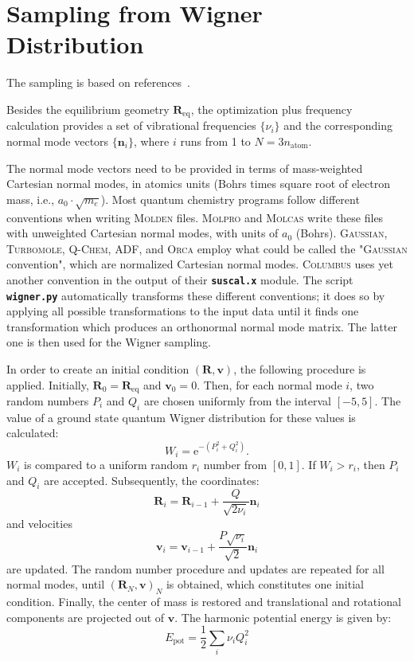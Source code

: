 \documentclass[a4paper,10pt,DIV=15,openany]{scrbook}
\newcommand{\ttt}[1]{\textbf{\texttt{#1}}}
\newcommand{\E}{\ensuremath{\mathrm{e}}}
\newcommand{\VEC}[1]{\ensuremath{\mathbf{#1}}}
\begin{document}
\section{Sampling from Wigner Distribution}\label{met:wigner}

The sampling is based on references~\cite{Dahl1988JCP, Schinke1995}.

Besides the equilibrium geometry $\VEC{R}_{\text{eq}}$, the optimization plus frequency calculation provides a set of vibrational frequencies $\{\nu_i\}$ and the corresponding normal mode vectors $\{\VEC{n}_i\}$, where $i$ runs from 1 to $N=3n_{\text{atom}}$.

The normal mode vectors need to be provided in terms of mass-weighted Cartesian normal modes, in atomics units (Bohrs times square root of electron mass, i.e., $a_0\cdot\sqrt{m_e}$).
Most quantum chemistry programs follow different conventions when writing \textsc{Molden} files. \textsc{Molpro} and \textsc{Molcas} write these files with unweighted Cartesian normal modes, with units of $a_0$ (Bohrs). \textsc{Gaussian}, \textsc{Turbomole}, \textsc{Q-Chem}, \textsc{ADF}, and \textsc{Orca} employ what could be called the "\textsc{Gaussian} convention", which are normalized Cartesian normal modes. \textsc{Columbus} uses yet another convention in the output of their \ttt{suscal.x} module.
The script \ttt{wigner.py} automatically transforms these different conventions; it does so by applying all possible transformations to the input data until it finds one transformation which produces an orthonormal normal mode matrix.
The latter one is then used for the Wigner sampling.

In order to create an initial condition $(\VEC{R},\VEC{v})$, the following procedure is applied. Initially, $\VEC{R}_0=\VEC{R}_{\text{eq}}$ and $\VEC{v}_0=0$. Then, for each normal mode $i$, two random numbers $P_i$ and $Q_i$ are chosen uniformly from the interval $[-5,5]$. The value of a ground state quantum Wigner distribution for these values is calculated:
\begin{equation}
  W_i=\E^{-(P_i^2+Q_i^2)}.
\end{equation}
$W_i$ is compared to a uniform random $r_i$ number from $[0,1]$. If $W_i>r_i$, then $P_i$ and $Q_i$ are accepted.
Subsequently, the coordinates:
\begin{equation}
  \VEC{R}_i=\VEC{R}_{i-1} + \frac{Q}{\sqrt{2\nu_i}}\VEC{n}_i           \label{eq:wigner1}
\end{equation}
and velocities
\begin{equation}
  \VEC{v}_i=\VEC{v}_{i-1} + \frac{P\sqrt{\nu_i}}{\sqrt{2}}\VEC{n}_i    \label{eq:wigner2}
\end{equation}
are updated.
The random number procedure and updates are repeated for all normal modes, until $(\VEC{R}_N,\VEC{v})_N$ is obtained, which constitutes one initial condition. Finally, the center of mass is restored and translational and rotational components are projected out of $\VEC{v}$. The harmonic potential energy is given by:
\begin{equation}
  E_{\text{pot}}=\frac{1}{2}\sum\limits_i \nu_iQ_i^2
\end{equation}
\end{document}
